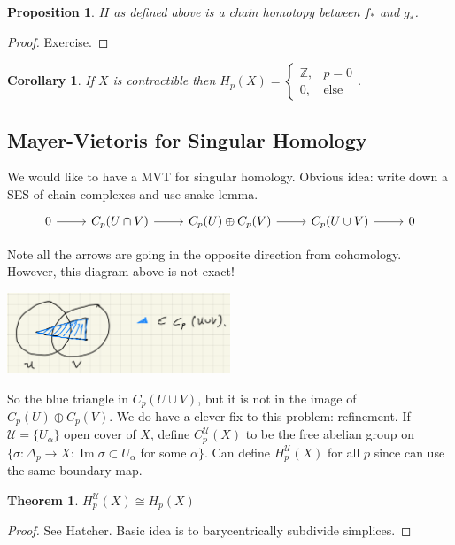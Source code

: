 \documentclass[10pt]{article}
\theoremstyle{plain}
\newtheorem{theorem}{Theorem}[section]
\newtheorem{corollary}[thm]{Corollary}
\newtheorem{prop}[thm]{Proposition}
\theoremstyle{definition}
\newcommand{\chartU}{\mathcal{U}}
\DeclareMathOperator{\Ima}{Im}
\newcommand{\mycasesthing}[2]{\begin{cases} #1 \\ #2\end{cases}}
\newcommand{\mysubsection}[1]{
    \subsection{#1}
}
\begin{document}
\begin{prop}
   $H$ as defined above is a chain homotopy between $f_*$ and $g_*$.
\end{prop}
\begin{proof}
    Exercise.
\end{proof}

\begin{corollary}
    If $X$ is contractible then $H_p(X) =\mycasesthing{ \mathbb{Z},& p= 0}{0,&\text{else}} $.
\end{corollary}

\mysubsection{Mayer-Vietoris for Singular Homology}
We would like to have a MVT for singular homology. Obvious idea: write down a SES of chain complexes and use snake lemma. $$%
\begin{tikzcd}
0 \arrow[r] & C_p(U\cap V) \arrow[r] & C_p(U)\oplus C_p(V) \arrow[r] & C_p(U\cup V) \arrow[r] & 0
\end{tikzcd}$$

Note all the arrows are going in the opposite direction from cohomology. However, this diagram above is not exact!
\begin{center}
    \includegraphics[width = 0.5\textwidth]{MayerVietorisNotExactSingularHomology.png}
\end{center}
So the blue triangle in $C_p(U\cup V)$, but it is not in the image of $C_p(U)\oplus C_p(V)$. We do have a clever fix to this problem: refinement. If $\chartU = \{ U_\alpha\}$ open cover of $X$, define $C_p^\chartU(X)$ to be the free abelian group on $\{\sigma : \Delta_p\to X : \Ima \sigma \subset U_\alpha $ for some $\alpha\}$. Can define $H^\chartU_p(X) $ for all $p$ since can use the same boundary map.

\begin{theorem}
    $H^\chartU_p(X) \cong H_p(X)$
\end{theorem}
\begin{proof}
    See Hatcher. Basic idea is to barycentrically subdivide simplices.
\end{proof}
\end{document}
